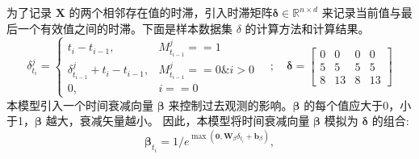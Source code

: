 为了记录 $\boldsymbol{X}$ 的两个相邻存在值的时滞，引入时滞矩阵$\boldsymbol{\delta} \in \mathbb{R}^{n \times d}$ 来记录当前值与最后一个有效值之间的时滞。下面是样本数据集 $\delta$ 的计算方法和计算结果。
\begin{equation}
    \delta_{t_i}^j=\left\{\begin{array}{ll}
    t_i-t_{i-1}, & M_{t_{i-1}}^j==1 \\
    \delta_{t_{i-1}}^j+t_i-t_{i-1}, & M_{t_{i-1}}^j==0 \& i>0 \\
    0, & i==0
    \end{array} \quad ; \quad \boldsymbol{\delta}=\left[\begin{array}{cccc}
    0 & 0 & 0 & 0 \\
    5 & 5 & 5 & 5 \\
    8 & 13 & 8 & 13
    \end{array}\right]\right.
    \end{equation}
本模型引入一个时间衰减向量 $\boldsymbol{\beta}$ 来控制过去观测的影响。$\boldsymbol{\beta}$ 的每个值应大于0，小于1，$\boldsymbol{\beta}$  越大，衰减矢量越小。
因此，本模型将时间衰减向量 $\boldsymbol{\beta}$  模拟为 $\boldsymbol{\delta}$ 的组合:   
\begin{equation}
    \boldsymbol{\beta}_{t_i}=1 / e^{\max \left(\mathbf{0}, \boldsymbol{W}_\beta \delta_{t_i}+\boldsymbol{b}_\beta\right)},
    \end{equation}
